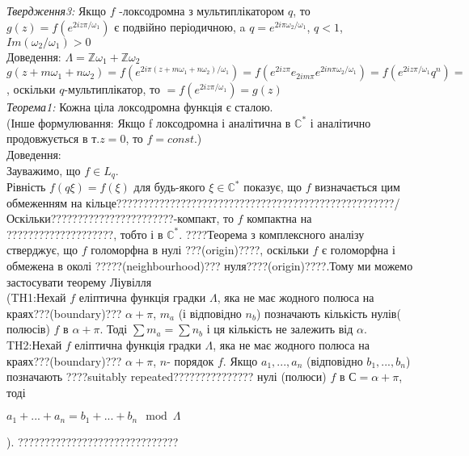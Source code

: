 \documentclass[12pt,a4paper]{article}
\begin{document}
\emph{Твердження3:} Якщо $f$  -локсодромна з мультиплікатором $q$, то  $g(z)=f(e^{2iz\pi/\omega_{1}})$ є подвійно періодичною, a $q=e^{2i\pi \omega_{2}/ \omega_{1}}$, $q<1$, $Im(\omega_{2}/\omega_{1})>0$\\
Доведення: $ \Lambda = \mathbb{Z}\omega_{1} + \mathbb{Z}\omega_{2} $ \\
$g(z+m\omega_{1}+ n\omega_{2})= f(e^{2i\pi(z+m\omega_{1}+ n\omega_{2})/\omega_{1}})=f( e^{2iz\pi}e_{2im\pi}e^{2in\pi\omega_{2} / \omega_{1}} )=f(e^{2iz\pi/\omega_{1}}q^{n})= $, оскільки $q$-мультиплікатор, то
 $=f(e^{2iz\pi/\omega_{1}})=g(z)$\\
 
\emph{Теорема1:} Кожна ціла локсодромна функція є сталою.\\
(Інше формулювання: Якщо f локсодромна і аналітична в $\mathbb{C}^{*}$ і аналітично продовжується в т.$z=0$, то $f=const$.)\\
Доведення:\\
Зауважимо, що $f\in L_{q}$.\\
Рівність $f(q\xi)=f(\xi)$ для будь-якого $\xi \in \mathbb{C}^{*}$ показує, що $f$ визначається цим обмеженням на кільце????????????????????????????????????????????????????/ Оскільки???????????????????????-компакт, то $f$ компактна на ????????????????????, тобто і в $\mathbb{C}^{*}$. ????Теорема з комплексного аналізу стверджує, що $f$ голоморфна в нулі ???(origin)????, оскільки $f$ є голоморфна і обмежена в околі ?????(neighbourhood)??? нуля????(origin)????.Тому ми можемо застосувати теорему Ліувілля \\
(TH1:Нехай $f$ еліптична функція градки $\Lambda$, яка не має жодного полюса на краях???(boundary)??? $\alpha+\pi$, $m_{a}$ (і відповідно $n_{b}$) позначають кількість нулів( полюсів) $f$ в $\alpha+\pi$. Тоді $\sum m_{a}=\sum n_{b}$ і ця кількість не залежить від $\alpha$.\\

TH2:Нехай $f$ еліптична функція градки $\Lambda$, яка не має жодного полюса на краях???(boundary)??? $\alpha+\pi$, $n$- порядок $f$. Якщо $a_{1},...,a_{n}$ (відповідно $b_{1},...,b_{n}$) позначають ????suitably repeated??????????????? нулі (полюси) $f$ в $С=\alpha+\pi$, тоді
\begin{center}
$a_{1}+...+a_{n}=b_{1}+...+b_{n}\mod\Lambda$
\end{center} ). ??????????????????????????????\\
\end{document}

